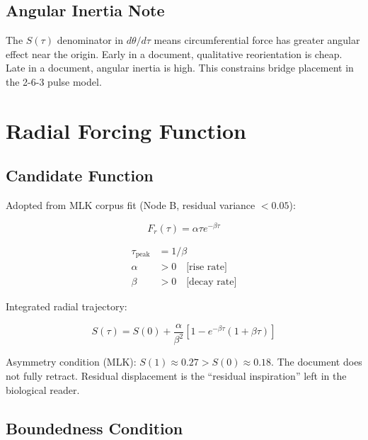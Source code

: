 \documentclass{article}
\begin{document}
\subsection*{Angular Inertia Note}

The $S(\tau)$ denominator in $d\theta/d\tau$ means circumferential
force has greater angular effect near the origin. Early in a document,
qualitative reorientation is cheap. Late in a document, angular inertia
is high. This constrains bridge placement in the 2-6-3 pulse model.

\section{Radial Forcing Function}

\subsection*{Candidate Function}

Adopted from MLK corpus fit (Node B, residual variance $< 0.05$):

\begin{equation}
F_r(\tau) = \alpha \tau e^{-\beta\tau}
\end{equation}

\begin{align}
  \tau_{\text{peak}} &= 1/\beta \\
  \alpha &> 0 \quad \text{[rise rate]} \\
  \beta  &> 0 \quad \text{[decay rate]}
\end{align}

Integrated radial trajectory:

\begin{equation}
S(\tau) = S(0) + \frac{\alpha}{\beta^2}
  \left[1 - e^{-\beta\tau}(1 + \beta\tau)\right]
\end{equation}

Asymmetry condition (MLK): $S(1) \approx 0.27 > S(0) \approx 0.18$.
The document does not fully retract. Residual displacement is the
``residual inspiration'' left in the biological reader.

\subsection*{Boundedness Condition}
\end{document}
